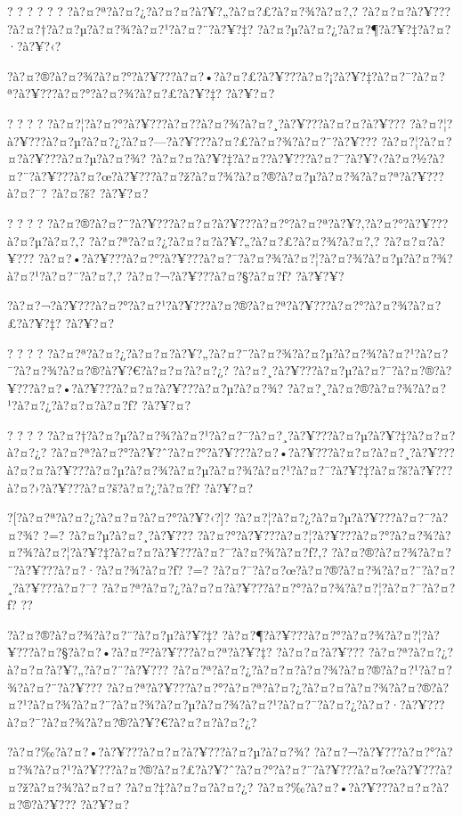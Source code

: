 \documentclass[11pt, openany]{book}
\begin{document}
{{{{{{{{{{? ? ? ? ? ? ?à?¤?ª?à?¤?¿?à?¤?¤?à?¥?„?à?¤?£?à?¤?¾?à?¤?‚? ?à?¤?¤?à?¥???
?à?¤?†?à?¤?µ?à?¤?¾?à?¤?¹?à?¤?¨?à?¥?‡?
?à?¤?µ?à?¤?¿?à?¤?¶?à?¥?‡?à?¤?·?à?¥?‹?

?à?¤?®?à?¤?¾?à?¤?°?à?¥???à?¤?•?à?¤?£?à?¥???à?¤?¡?à?¥?‡?à?¤?¯?à?¤?ª?à?¥???à?¤?°?à?¤?¾?à?¤?£?à?¥?‡?
?à?¥?¤?

? ? ? ? ?à?¤?¦?à?¤?°?à?¥???à?¤?­?à?¤?¾?à?¤?¸?à?¥???à?¤?¤?à?¥???
?à?¤?¦?à?¥???à?¤?µ?à?¤?¿?à?¤?---?à?¥???à?¤?£?à?¤?¾?à?¤?¨?à?¥???
?à?¤?¦?à?¤?¤?à?¥???à?¤?µ?à?¤?¾?
?à?¤?¤?à?¥?‡?à?¤?­?à?¥???à?¤?¯?à?¥?‹?à?¤?½?à?¤?¨?à?¥???à?¤?œ?à?¥???à?¤?ž?à?¤?¾?à?¤?®?à?¤?µ?à?¤?¾?à?¤?ª?à?¥???à?¤?¯?
?à?¤?š? ?à?¥?¤?

? ? ? ?
?à?¤?®?à?¤?¨?à?¥???à?¤?¤?à?¥???à?¤?°?à?¤?ª?à?¥?‚?à?¤?°?à?¥???à?¤?µ?à?¤?‚?
?à?¤?ª?à?¤?¿?à?¤?¤?à?¥?„?à?¤?£?à?¤?¾?à?¤?‚? ?à?¤?¤?à?¥???
?à?¤?•?à?¥???à?¤?°?à?¥???à?¤?¯?à?¤?¾?à?¤?¦?à?¤?¾?à?¤?µ?à?¤?¾?à?¤?¹?à?¤?¨?à?¤?‚?
?à?¤?¬?à?¥???à?¤?§?à?¤?ƒ? ?à?¥?¥?

?à?¤?¬?à?¥???à?¤?°?à?¤?¹?à?¥???à?¤?®?à?¤?ª?à?¥???à?¤?°?à?¤?¾?à?¤?£?à?¥?‡?
?à?¥?¤?

? ? ? ?
?à?¤?ª?à?¤?¿?à?¤?¤?à?¥?„?à?¤?¨?à?¤?¾?à?¤?µ?à?¤?¾?à?¤?¹?à?¤?¯?à?¤?¾?à?¤?®?à?¥?€?à?¤?¤?à?¤?¿?
?à?¤?¸?à?¥???à?¤?µ?à?¤?¯?à?¤?®?à?¥???à?¤?•?à?¥???à?¤?¤?à?¥???à?¤?µ?à?¤?¾?
?à?¤?¸?à?¤?®?à?¤?¾?à?¤?¹?à?¤?¿?à?¤?¤?à?¤?ƒ? ?à?¥?¤?

? ? ? ?
?à?¤?†?à?¤?µ?à?¤?¾?à?¤?¹?à?¤?¯?à?¤?¸?à?¥???à?¤?µ?à?¥?‡?à?¤?¤?à?¤?¿?
?à?¤?ª?à?¤?°?à?¥?ˆ?à?¤?°?à?¥???à?¤?•?à?¥???à?¤?¤?à?¤?¸?à?¥???à?¤?¤?à?¥???à?¤?µ?à?¤?¾?à?¤?µ?à?¤?¾?à?¤?¹?à?¤?¯?à?¥?‡?à?¤?š?à?¥???à?¤?›?à?¥???à?¤?š?à?¤?¿?à?¤?ƒ?
?à?¥?¤?

?[?à?¤?ª?à?¤?¿?à?¤?¤?à?¤?°?à?¥?‹?]?
?à?¤?¦?à?¤?¿?à?¤?µ?à?¥???à?¤?¯?à?¤?¾? ?=? ?à?¤?µ?à?¤?¸?à?¥???
?à?¤?°?à?¥???à?¤?¦?à?¥???à?¤?°?à?¤?¾?à?¤?¾?à?¤?¦?à?¥?‡?à?¤?¤?à?¥???à?¤?¯?à?¤?¾?à?¤?ƒ?,?
?à?¤?®?à?¤?¾?à?¤?¨?à?¥???à?¤?·?à?¤?¾?à?¤?ƒ? ?=?
?à?¤?¯?à?¤?œ?à?¤?®?à?¤?¾?à?¤?¨?à?¤?¸?à?¥???à?¤?¯?
?à?¤?ª?à?¤?¿?à?¤?¤?à?¥???à?¤?°?à?¤?¾?à?¤?¦?à?¤?¯?à?¤?ƒ? ?\textbar{}?

?à?¤?®?à?¤?¾?à?¤?¨?à?¤?µ?à?¥?‡?
?à?¤?¶?à?¥???à?¤?°?à?¤?¾?à?¤?¦?à?¥???à?¤?§?à?¤?•?à?¤?²?à?¥???à?¤?ª?à?¥?‡?
?à?¤?¤?à?¥??? ?à?¤?ª?à?¤?¿?à?¤?¤?à?¥?„?à?¤?¨?à?¥???
?à?¤?ª?à?¤?¿?à?¤?¤?à?¤?¾?à?¤?®?à?¤?¹?à?¤?¾?à?¤?¨?à?¥???
?à?¤?ª?à?¥???à?¤?°?à?¤?ª?à?¤?¿?à?¤?¤?à?¤?¾?à?¤?®?à?¤?¹?à?¤?¾?à?¤?¨?à?¤?¾?à?¤?µ?à?¤?¾?à?¤?¹?à?¤?¯?à?¤?¿?à?¤?·?à?¥???à?¤?¯?à?¤?¾?à?¤?®?à?¥?€?à?¤?¤?à?¤?¿?

?à?¤?‰?à?¤?•?à?¥???à?¤?¤?à?¥???à?¤?µ?à?¤?¾?
?à?¤?¬?à?¥???à?¤?°?à?¤?¾?à?¤?¹?à?¥???à?¤?®?à?¤?£?à?¥?ˆ?à?¤?°?à?¤?¨?à?¥???à?¤?œ?à?¥???à?¤?ž?à?¤?¾?à?¤?¤?
?à?¤?‡?à?¤?¤?à?¤?¿? ?à?¤?‰?à?¤?•?à?¥???à?¤?¤?à?¤?®?à?¥??? ?à?¥?¤?

}}}}}}}}}}
\end{document}
